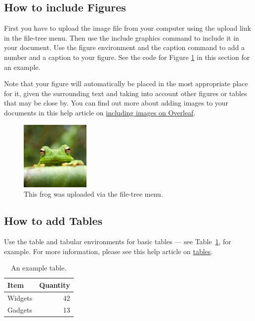 \documentclass{article}
\begin{document}
\subsection{How to include Figures}

First you have to upload the image file from your computer using the upload link in the file-tree menu. Then use the include graphics command to include it in your document. Use the figure environment and the caption command to add a number and a caption to your figure. See the code for Figure \ref{fig:frog} in this section for an example.

Note that your figure will automatically be placed in the most appropriate place for it, given the surrounding text and taking into account other figures or tables that may be close by. You can find out more about adding images to your documents in this help article on \href{https://www.overleaf.com/learn/how-to/Including_images_on_Overleaf}{including images on Overleaf}.
\newpage
\begin{figure}
\centering
\includegraphics[width=0.3\textwidth]{frog.jpg}
\caption{\label{fig:frog}This frog was uploaded via the file-tree menu.}
\end{figure}

\subsection{How to add Tables}

Use the table and tabular environments for basic tables --- see Table~\ref{tab:widgets}, for example. For more information, please see this help article on \href{https://www.overleaf.com/learn/latex/tables}{tables}. 

\begin{table}
\centering
\begin{tabular}{l|r}
Item & Quantity \\\hline
Widgets & 42 \\
Gadgets & 13
\end{tabular}
\caption{\label{tab:widgets}An example table.}
\end{table}
\end{document}
